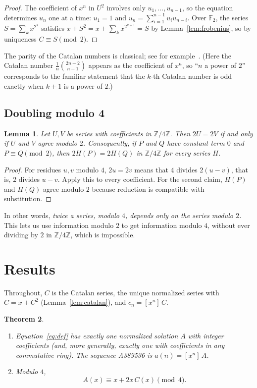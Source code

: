 \documentclass[11pt,a4paper]{article}
\newtheorem{theorem}{Theorem}[section]
\newtheorem{lemma}[theorem]{Lemma}
\theoremstyle{definition}
\theoremstyle{remark}
\newcommand{\Z}{\mathbb{Z}}
\newcommand{\F}{\mathbb{F}}
\newcommand{\coeff}[2]{[x^{#1}]\,#2}
\begin{document}
\begin{proof}
The coefficient of $x^n$ in $U^2$ involves only $u_1,\dots,u_{n-1}$, so the equation determines $u_n$ one at a time:
$u_1=1$ and $u_n=\sum_{i=1}^{n-1}u_iu_{n-i}$. Over $\F_2$, the series $S=\sum_kx^{2^k}$ satisfies
$x+S^2=x+\sum_kx^{2^{k+1}}=S$ by Lemma~\ref{lem:frobenius}, so by uniqueness $C\equiv S\pmod2$.
\end{proof}
The parity of the Catalan numbers is classical; see for example~\cite{deutschsagan}. (Here the Catalan number
$\frac1{n}\binom{2n-2}{n-1}$ appears as the coefficient of $x^n$, so ``$n$ a power of $2$'' corresponds to the familiar
statement that the $k$-th Catalan number is odd exactly when $k+1$ is a power of $2$.)

\subsection{Doubling modulo 4}
\begin{lemma}\label{lem:double}
Let $U,V$ be series with coefficients in $\Z/4\Z$. Then $2U=2V$ if and only if $U$ and $V$ agree modulo $2$.
Consequently, if $P$ and $Q$ have constant term $0$ and $P\equiv Q\pmod 2$, then $2H(P)=2H(Q)$ in $\Z/4\Z$ for every
series $H$.
\end{lemma}

\begin{proof}
For residues $u,v$ modulo $4$, $2u=2v$ means that $4$ divides $2(u-v)$, that is, $2$ divides $u-v$. Apply this to
every coefficient. For the second claim, $H(P)$ and $H(Q)$ agree modulo $2$ because reduction is compatible with
substitution.
\end{proof}
In other words, \emph{twice a series, modulo $4$, depends only on the series modulo $2$.} This lets us use information modulo
$2$ to get information modulo $4$, without ever dividing by $2$ in $\Z/4\Z$, which is impossible.

\section{Results}\label{sec:results}

Throughout, $C$ is the Catalan series, the unique normalized series with $C=x+C^2$ (Lemma~\ref{lem:catalan}), and
$c_n=\coeff{n}{C}$.

\begin{theorem}\label{thm:main}
\begin{enumerate}[label=(\alph*)]
\item Equation~\eqref{eq:def} has exactly one normalized solution $A$ with integer coefficients (and, more generally,
exactly one with coefficients in any commutative ring). The sequence A389536 is $a(n)=\coeff{n}{A}$.
\item Modulo $4$,
\[
A(x)\equiv x+2x\,C(x)\pmod 4 .
\]
\end{enumerate}
\end{theorem}
\end{document}
